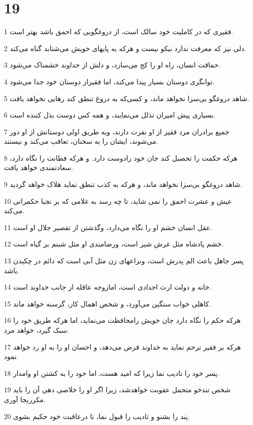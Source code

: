 \chapter{19}

\par 1 فقیری که در کاملیت خود سالک است، از دروغگویی که احمق باشد بهتر است.
\par 2 دلی نیز که معرفت ندارد نیکو نیست و هر‌که به پایهای خویش می‌شتابد گناه می‌کند.
\par 3 حماقت انسان، راه او را کج می‌سازد، و دلش از خداوند خشمناک می‌شود.
\par 4 توانگری دوستان بسیار پیدا می‌کند، اما فقیراز دوستان خود جدا می‌شود.
\par 5 شاهد دروغگو بی‌سزا نخواهد ماند، و کسی‌که به دروغ تنطق کند رهایی نخواهد یافت.
\par 6 بسیاری پیش امیران تذلل می‌نمایند، و همه کس دوست بذل کننده است.
\par 7 جمیع برادران مرد فقیر از او نفرت دارند، وبه طریق اولی دوستانش از او دور می‌شوند، ایشان را به سخنان، تعاقب می‌کند و نیستند.
\par 8 هر‌که حکمت را تحصیل کند جان خود رادوست دارد. و هر‌که فطانت را نگاه دارد، سعادتمندی خواهد یافت.
\par 9 شاهد دروغگو بی‌سزا نخواهد ماند، و هر‌که به کذب تنطق نماید هلاک خواهد گردید.
\par 10 عیش و عشرت احمق را نمی شاید، تا چه رسد به غلامی که بر نجبا حکمرانی می‌کند.
\par 11 عقل انسان خشم او را نگاه می‌دارد، وگذشتن از تقصیر جلال او است.
\par 12 خشم پادشاه مثل غرش شیر است، ورضامندی او مثل شبنم بر گیاه است.
\par 13 پسر جاهل باعث الم پدرش است، ونزاعهای زن مثل آبی است که دائم در چکیدن باشد.
\par 14 خانه و دولت ارث اجدادی است، امازوجه عاقله از جانب خداوند است.
\par 15 کاهلی خواب سنگین می‌آورد، و شخص اهمال کار، گرسنه خواهد ماند.
\par 16 هر‌که حکم را نگاه دارد جان خویش رامحافظت می‌نماید، اما هر‌که طریق خود را سبک گیرد، خواهد مرد.
\par 17 هر‌که بر فقیر ترحم نماید به خداوند قرض می‌دهد، و احسان او را به او رد خواهد نمود.
\par 18 پسر خود را تادیب نما زیرا که امید هست، اما خود را به کشتن او وامدار.
\par 19 شخص تندخو متحمل عقوبت خواهدشد، زیرا اگر او را خلاصی دهی آن را باید مکرربجا آوری.
\par 20 پند را بشنو و تادیب را قبول نما، تا درعاقبت خود حکیم بشوی.
